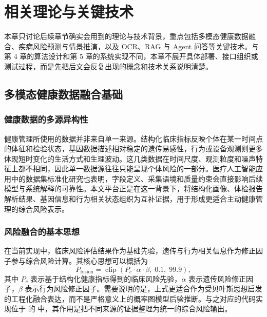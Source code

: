 
\chapter{相关理论与关键技术}
\label{sec:theory}

本章只讨论后续章节确实会用到的理论与技术背景，重点包括多模态健康数据融合、疾病风险预测与情景推演，以及 OCR、RAG 与 Agent 问答等关键技术。与第 4 章的算法设计和第 5 章的系统实现不同，本章不展开具体部署、接口组织或测试过程，而是先把后文会反复出现的概念和技术关系说明清楚。

\section{多模态健康数据融合基础}
\subsection{健康数据的多源异构性}
健康管理所使用的数据并非来自单一来源。结构化临床指标反映个体在某一时间点的体征和检验状态，基因数据描述相对稳定的遗传易感性，行为或设备观测则更多体现短时变化的生活方式和生理波动。这几类数据在时间尺度、观测粒度和噪声特征上都不相同，因此单一数据源往往只能呈现个体风险的一部分。医疗人工智能应用中的数据集标准化研究也表明，字段定义、采集语境和质量约束会直接影响后续模型与系统解释的可靠性\cite{arora2023healthdatasetstandards}。本文平台正是在这一背景下，将结构化画像、体检报告解析结果、基因信息和行为相关状态组织为互补证据，用于形成更适合主动健康管理的综合风险表示。

\subsection{风险融合的基本思想}
在当前实现中，临床风险评估结果作为基础先验，遗传与行为相关信息作为修正因子参与综合风险计算。其核心思想可以概括为
\begin{equation}
    P_{\mathrm{fusion}}=\operatorname{clip}(P_c\cdot \alpha \cdot \beta,\;0.1,\;99.9),
    \label{eq:fusion_theory_compact}
\end{equation}
其中 \(P_c\) 表示基于结构化健康指标得到的临床风险先验，\(\alpha\) 表示遗传风险修正因子，\(\beta\) 表示行为风险修正因子。需要说明的是，上式更适合作为受贝叶斯思想启发的工程化融合表达，而不是严格意义上的概率图模型后验推断。与之对应的代码实现位于  的  中，其作用是把不同来源的证据整理为统一的综合风险输出。

